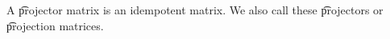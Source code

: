 


A \t{projector matrix} is an idempotent matrix.
We also call these \t{projectors} or \t{projection matrices}.
